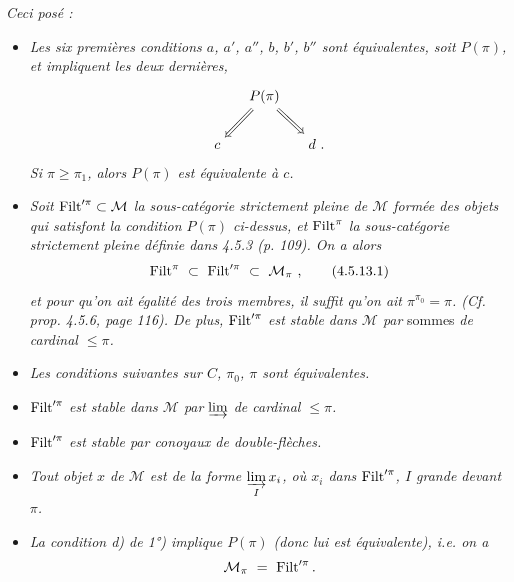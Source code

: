 
\textit{Ceci posé :}
\begin{itemize}[leftmargin=3em]
\item[\circled{1\textsuperscript{\textit{o}}}] \textit{Les six premières conditions $a$, $a'$, $a''$, $b$, $b'$, $b''$ sont équivalentes, soit $P(\pi)$, et impliquent les deux dernières,}
\[
\begin{tikzcd}[column sep=small]
 & P(\pi) \arrow[dl, Rightarrow] \arrow[dr, Rightarrow] & \\
c & & d \ .
\end{tikzcd}
\]
\textit{Si $\pi \geqslant \pi_1$, alors $P(\pi)$ est équivalente à $c$.}
\item[\circled{2\textsuperscript{\textit{o}}}] \textit{Soit $\operatorname{Filt}'^{\pi} \subset \mathcal{M}$ la sous-catégorie strictement pleine de $\mathcal{M}$ formée des objets qui satisfont la condition $P(\pi)$ ci-dessus, et $\operatorname{Filt}^\pi$ la sous-catégorie strictement pleine définie dans 4.5.3 (p. 109). On a alors}
\[
\Filt^\pi \ \subset \ \Filt'^{\pi} \ \subset \ \mathcal{M}_\pi \ , \tag*{(4.5.13.1)}
\]
\textit{et pour qu'on ait égalité des trois membres, il suffit qu'on ait $\pi^{\pi_0} = \pi$. (Cf. prop. 4.5.6, page 116). De plus, $\operatorname{Filt}'^{\pi}$ est stable dans $\mathcal{M}$ par} sommes \textit{de cardinal $\leqslant \pi$.}
\item[\circled{3\textsuperscript{\textit{o}}}] \textit{Les conditions suivantes sur $C$, $\pi_0$, $\pi$ sont équivalentes.}
\end{itemize}

\setcounter{footnote}{49}


\begin{itemize}
\item[\textit{1)}] $\operatorname{Filt}'^{\pi}$ \textit{est stable dans $\mathcal{M}$ par} $\varinjlim$ \textit{de cardinal $\leqslant \pi$.}
\item[\textit{1$'$)}] $\operatorname{Filt}'^{\pi}$ \textit{est stable par conoyaux de double-flèches.}
\item[\textit{2)}] \textit{Tout objet $x$ de $\mathcal{M}$ est de la forme $\varinjlim\limits_{I} x_i$, où $x_i$ dans} $\operatorname{Filt}'^{\pi}$\textit{, $I$ grande devant $\pi$.}
\item[\textit{3)}] \textit{La condition d) de 1°) implique $P(\pi)$ (donc lui est équivalente), i.e. on a}
\[ \mathcal{M}_{\pi} \ = \ \Filt'^{\pi}. \]
\end{itemize}

